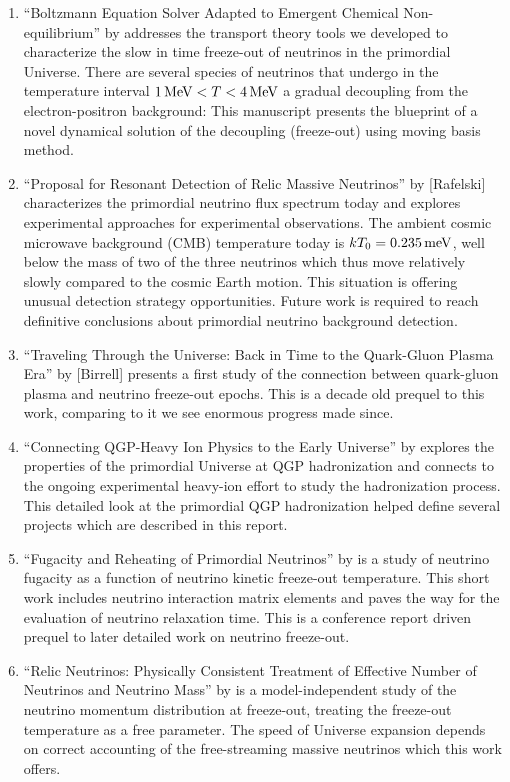 \begin{enumerate}
%
\item ``Boltzmann Equation Solver Adapted to Emergent Chemical Non-equilibrium'' by  addresses the transport theory tools we developed to characterize the slow in time freeze-out of neutrinos in the primordial Universe. {\color{blue} There are several species of neutrinos that undergo in the temperature interval $1\text{\,MeV}<T<4\text{\,MeV}$ a gradual decoupling from the electron-positron background: This manuscript presents the blueprint of a novel dynamical solution of the decoupling (freeze-out) using moving basis method.}
%
\item ``Proposal for Resonant Detection of Relic Massive Neutrinos'' by [Rafelski] characterizes the primordial neutrino flux spectrum today and explores experimental approaches for experimental observations. {\color{blue} The ambient cosmic microwave background (CMB) temperature today is $kT_0=0.235\text{\,meV}$, well below the mass of two of the three neutrinos which thus move relatively slowly compared to the cosmic Earth motion. This situation is offering unusual detection strategy opportunities. Future work is required to reach definitive conclusions about primordial neutrino background detection.}
%
\item ``Traveling Through the Universe: Back in Time to the Quark-Gluon Plasma Era'' by [Birrell] presents a first study of the connection between quark-gluon plasma and neutrino freeze-out epochs. {\color{blue} This is a decade old prequel to this work, comparing to it we see enormous progress made since.}
%
\item ``Connecting QGP-Heavy Ion Physics to the Early Universe'' by  explores the properties of the primordial Universe at QGP hadronization and connects to the ongoing experimental heavy-ion effort to study the hadronization process. {\color{blue} This detailed look at the primordial QGP hadronization helped define several projects which are described in this report.}
%
\item ``Fugacity and Reheating of Primordial Neutrinos'' by  is a study of neutrino fugacity as a function of neutrino kinetic freeze-out temperature. This short work includes {\color{blue} neutrino interaction matrix elements and paves the way for the evaluation of neutrino relaxation time. This is a conference report driven prequel to later detailed work on neutrino freeze-out.}
%
\item ``Relic Neutrinos: Physically Consistent Treatment of Effective Number of Neutrinos and Neutrino Mass'' by  is a model-independent study of the neutrino momentum distribution at freeze-out, treating the freeze-out temperature as a free parameter. {\color{blue} The speed of Universe expansion depends on correct accounting of the free-streaming massive neutrinos which this work offers.}

\end{enumerate}
